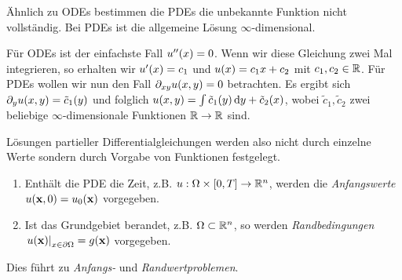\documentclass{lecture}
\begin{document}
    Ähnlich zu ODEs bestimmen die PDEs die unbekannte Funktion nicht vollständig.
    Bei PDEs ist die allgemeine Lösung \(\infty\)-dimensional.
    \begin{example}
        Für ODEs ist der einfachste Fall \(u''\parentheses*{x} = 0\).
        Wenn wir diese Gleichung zwei Mal integrieren, so erhalten wir \(u'\parentheses*{x} = c_1\) und \(u\parentheses*{x} = c_1 x + c_2\) mit \(c_1, c_2 \in \R\).
        Für PDEs wollen wir nun den Fall \(\partial_{xy}u\parentheses*{x, y} = 0\) betrachten.
        Es ergibt sich \(\partial_y u\parentheses*{x, y} = \tilde{c}_1\parentheses*{y}\) und folglich \(u\parentheses*{x, y} = \int \tilde{c}_1\parentheses*{y}\d y + \tilde{c}_2\parentheses*{x}\), wobei \(\tilde{c}_1, \tilde{c}_2\) zwei beliebige \(\infty\)-dimensionale Funktionen \(\R \to \R\) sind.
    \end{example}
    Lösungen partieller Differentialgleichungen werden also nicht durch einzelne Werte sondern durch Vorgabe von Funktionen festgelegt.
    \begin{definition}
        \begin{enumerate}
            \item Enthält die PDE die Zeit, z.B. \(u: \Omega \times \brackets*{0, T} \to \R^n\), werden die \emph{Anfangswerte} \(u\parentheses*{\mathbf{x}, 0} = u_0\parentheses*{\mathbf{x}}\) vorgegeben.
            \item Ist das Grundgebiet berandet, z.B. \(\Omega \subset \R^n\), so werden \emph{Randbedingungen} \(\left.u\parentheses*{\mathbf{x}}\right|_{x \in \partial\Omega} = g\parentheses*{\mathbf{x}}\) vorgegeben.
        \end{enumerate}
        Dies führt zu \emph{Anfangs-} und \emph{Randwertproblemen}.
    \end{definition}
\end{document}
